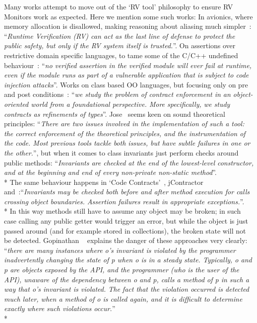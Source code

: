 \noindent Many works attempt to move out of the `RV tool' philosophy to ensure RV Monitors work as expected. Here
we mention some such works:
\sepItems
In avionics, where memory allocation is disallowed, making reasoning about aliasing much simpler~\cite{laurent2015assuring}:
``\emph{Runtime Verification (RV) can act as the last line of defense to
protect the public safety, but only if the RV system itself is trusted.}''.
\sepItems
On assertions over restrictive domain specific languages, to tame some of the C/C++
undefined behaviour~\cite{agten2015sound}:
``\emph{no verified assertion in the verified
module will ever fail at runtime, even if the module runs as part of
a vulnerable application that is subject to code injection attacks}''.
\sepItems
Works on class based OO languages, but focusing only on pre and post conditions~\cite{findler2001contract}:
``\emph{we  study  the  problem  of  contract  enforcement in
an object-oriented world from  a foundational perspective.   More
specifically, we study contracts as refinements of types}''.
\sepItems
Jose~\cite{feldman2006jose} seems keen on sound theoretical principles:
``\emph{There are two issues involved
in the implementation of such a tool: the correct enforcement of the theoretical principles, and the instrumentation
of the code. Most previous tools tackle both issues, but have
subtle failures in one or the other.}'',
but when it comes to class invariants just perform checks around public methods:
``\emph{Invariants are checked at the end of the lowest-level constructor,
 and at the beginning and end of every non-private non-static method}''.\\*
The same behaviour happens in `Code Contracts'~\cite{fahndrich2010embedded},
jContractor~\cite{abercrombie2002jcontractor}
and~\cite{tran2003design}:``\emph{Invariants may be checked both before and after
method  execution  for  calls  crossing  object  boundaries.
Assertion  failures  result  in  appropriate  exceptions.}''.\\*
In this way methods still have to assume any object may be broken; in such case calling any
public getter would trigger an error, but while the object is just passed around
(and for example stored in collections), the broken state will not be detected.
Gopinathan ~\cite{Gopinathan:2008:RMO:1483018.1483028}
explains the danger of these approaches very clearly:
``\emph{there are many instances where o's invariant is violated by the programmer inadvertently changing the state
of p when o is in a steady state. Typically, o and p
are objects exposed by the API, and the programmer (who is the user of the API), unaware of
the dependency between o and p, calls a method of p in such a way that
o's invariant is violated. The fact that the violation occurred is detected
much later, when a method of o is called again, and it is difficult to 
determine exactly where such violations occur.}''\\*
